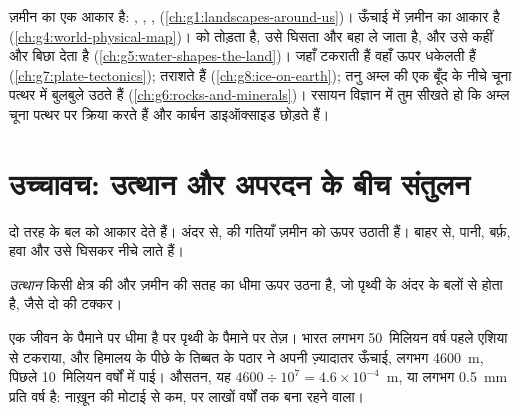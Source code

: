 \begin{recall}
\emph{} ज़मीन का एक आकार है: , , , 
(\cref{ch:g1:landscapes-around-us})।  ऊँचाई में ज़मीन का आकार है
(\cref{ch:g4:world-physical-map})।   को तोड़ता है,  उसे घिसता और
बहा ले जाता है, और  उसे कहीं और बिछा देता है
(\cref{ch:g5:water-shapes-the-land})।  जहाँ टकराती हैं वहाँ  ऊपर
धकेलती हैं (\cref{ch:g7:plate-tectonics});   तराशते हैं
(\cref{ch:g8:ice-on-earth}); तनु अम्ल की एक बूँद के नीचे चूना पत्थर में बुलबुले उठते हैं
(\cref{ch:g6:rocks-and-minerals})। रसायन विज्ञान में तुम सीखते हो कि अम्ल चूना पत्थर
पर क्रिया करते हैं और कार्बन डाइऑक्साइड छोड़ते हैं।
\end{recall}

\section{उच्चावच: उत्थान और अपरदन के बीच संतुलन}

दो तरह के बल  को आकार देते हैं। अंदर से,  की गतियाँ ज़मीन को ऊपर उठाती हैं।
बाहर से, पानी, बर्फ़, हवा और  उसे घिसकर नीचे
लाते हैं।

\begin{definition}[उत्थान]\label{def:g9:landforms:uplift}
\emph{उत्थान} किसी क्षेत्र की  और ज़मीन की सतह का धीमा ऊपर उठना है,
जो पृथ्वी के अंदर के बलों से होता है, जैसे दो  की
टक्कर।
\end{definition}

 एक जीवन के पैमाने पर धीमा है पर पृथ्वी के पैमाने पर तेज़। भारत लगभग 50~मिलियन
वर्ष पहले एशिया से टकराया, और हिमालय के पीछे के तिब्बत के पठार ने अपनी ज़्यादातर ऊँचाई,
लगभग \qty{4600}{m}, पिछले 10~मिलियन वर्षों में पाई। औसतन, यह
$4600 \div 10^7 = 4.6 \times 10^{-4}$~m, या लगभग \qty{0.5}{mm} प्रति वर्ष है:
नाख़ून की मोटाई से कम, पर लाखों वर्षों तक बना रहने वाला।

